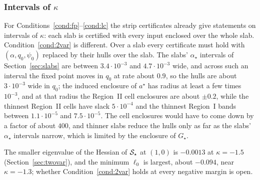 \subsubsection{Intervals of $\kappa$}
\label{sec:interval}

For Conditions~\ref{cond:fp}--\ref{cond:lc} the strip certificates
already give statements on intervals of $\kappa$: each slab is
certified with every input enclosed over the whole slab.
Condition~\ref{cond:2var} is different.  Over a slab every certificate must hold with
$(\alpha,q_0,\psi_0)$ replaced by their hulls over the slab.  The
slabs' $\alpha_\star$ intervals of Section~\ref{sec:slabs} are between
$3.4\cdot10^{-3}$ and $4.7\cdot10^{-3}$ wide, and across such an interval the fixed point moves in
$q_0$ at rate about $0.9$, so the hulls are about $3\cdot10^{-3}$ wide in
$q_0$; the induced enclosure of $a^\star$ has
radius at least a few times $10^{-3}$, and at
that radius the Region~II cell enclosures are about $\pm0.2$, while
the thinnest Region~II cells have slack $5\cdot10^{-4}$ and the
thinnest Region~I bands between $1.1\cdot10^{-5}$ and
$7.5\cdot10^{-5}$.  The cell enclosures would have to come down by
a factor of about $400$, and thinner slabs reduce the hulls only as
far as the slabs' $\alpha_\star$ intervals narrow, which is limited by
the enclosure of $G_\star$.

The smaller eigenvalue of the Hessian of $\mathcal{S}_\star$ at $(1,0)$ is
$-0.0013$ at $\kappa=-1.5$ (Section~\ref{sec:twovar}), and the minimum
$\ell_0$ is largest, about $-0.094$, near $\kappa=-1.3$; whether
Condition~\ref{cond:2var} holds at every negative margin is open.
